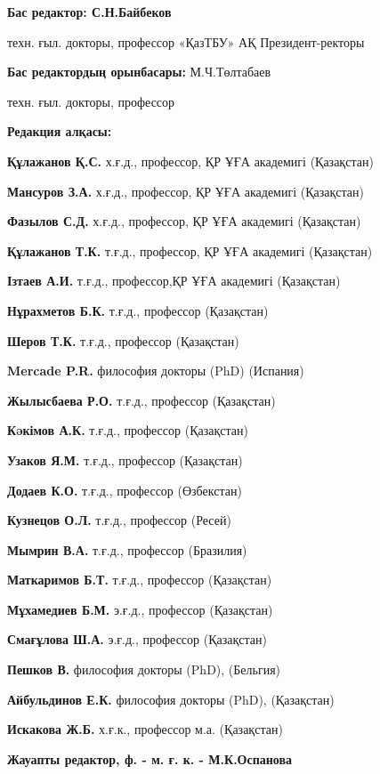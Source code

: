 \pagebreak
{\small
\begin{center}
\textbf{Бас редактор: С.Н.Байбеков}

техн. ғыл. докторы, профессор «ҚазТБУ» АҚ Президент-ректоры

\textbf{Бас редактордың орынбасары:} М.Ч.Төлтабаев

техн. ғыл. докторы, профессор

\textbf{Редакция алқасы:}
\end{center}

\textbf{Құлажанов Қ.С.} х.ғ.д., профессор, ҚР ҰҒА академигі (Қазақстан)

\textbf{Мансуров З.А.} х.ғ.д., профессор, ҚР ҰҒА академигі (Қазақстан)

\textbf{Фазылов С.Д.} х.ғ.д., профессор, ҚР ҰҒА академигі (Қазақстан)

\textbf{Құлажанов Т.К.} т.ғ.д., профессор, ҚР ҰҒА академигі (Қазақстан)

\textbf{Ізтаев А.И.} т.ғ.д., профессор,ҚР ҰҒА академигі (Қазақстан)

\textbf{Нұрахметов Б.К.} т.ғ.д., профессор (Қазақстан)

\textbf{Шеров Т.К.} т.ғ.д., профессор (Қазақстан)

\textbf{Mercade P.R.} философия докторы (PhD) (Испания)

\textbf{Жылысбаева Р.О.} т.ғ.д., профессор (Қазақстан)

\textbf{Кəкімов А.К.} т.ғ.д., профессор (Қазақстан)

\textbf{Узаков Я.М.} т.ғ.д., профессор (Қазақстан)

\textbf{Додаев К.О.} т.ғ.д., профессор (Өзбекстан)

\textbf{Кузнецов О.Л.} т.ғ.д., профессор (Ресей)

\textbf{Мымрин В.А.} т.ғ.д., профессор (Бразилия)

\textbf{Маткаримов Б.Т.} т.ғ.д., профессор (Қазақстан)

\textbf{Мұхамедиев Б.М.} э.ғ.д., профессор (Қазақстан)

\textbf{Смағұлова Ш.А.} э.ғ.д., профессор (Қазақстан)

\textbf{Пешков В.} философия докторы (PhD), (Бельгия)

\textbf{Айбульдинов Е.К.} философия докторы (PhD), (Қазақстан)

\textbf{Искакова Ж.Б.} х.ғ.к., профессор м.а. (Қазақстан)

\begin{center}
\textbf{Жауапты редактор, ф. - м. ғ. к. - М.К.Оспанова}
\end{center}

}
